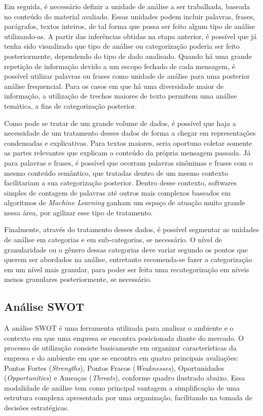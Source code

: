 Em seguida, é necessário definir a unidade de análise a ser trabalhada, baseada no conteúdo do material avaliado. Essas unidades podem incluir palavras, frases, parágrafos, textos inteiros, de tal forma que possa ser feito algum tipo de análise utilizando-as. A partir das inferências obtidas na etapa anterior, é possível que já tenha sido visualizado que tipo de análise ou categorização poderia ser feito posteriormente, dependendo do tipo de dado analisado. Quando há uma grande repetição de informação devido a um escopo fechado de cada mensagem, é possível utilizar palavras ou frases como unidade de análise para uma posterior análise frequencial. Para os casos em que há uma diversidade maior de informação, a utilização de trechos maiores de texto permitem uma análise temática, a fins de categorização posterior.

Como pode se tratar de um grande volume de dados, é possível que haja a necessidade de um tratamento desses dados de forma a chegar em representações condensadas e explicativas. Para textos maiores, seria oportuno coletar somente as partes relevantes que explicam o conteúdo da própria mensagem passada. Já para palavras e frases, é possível que ocorram palavras sinônimas e frases com o mesmo conteúdo semântico, que tratadas dentro de um mesmo contexto facilitariam a sua categorização posterior. Dentro desse contexto, softwares simples de contagem de palavras até outros mais complexos baseados em algoritmos de \textit{Machine Learning} ganham um espaço de atuação muito grande nessa área, por agilizar esse tipo de tratamento.

Finalmente, através do tratamento desses dados, é possível segmentar as unidades de análise em categorias e em sub-categorias, se necessário. O nível de granularidade ou o gênero dessas categorias deve variar segundo os pontos que querem ser abordados na análise, entretanto recomenda-se fazer a categorização em um nível mais granular, para poder ser feita uma recategorização em níveis menos granulares posteriormente, se necessário.

\subsection{Análise SWOT}
\label{cha:analise_swot}

A análise SWOT é uma ferramenta utilizada para analisar o ambiente e o contexto em que uma empresa se encontra posicionada diante do mercado. O processo de utilização consiste basicamente em organizar características da empresa e do ambiente em que se encontra em quatro principais avaliações: Pontos Fortes (\textit{Strengths}), Pontos Fracos (\textit{Weaknesses}), Oportunidades (\textit{Opportunities}) e Ameaças (\textit{Threats}), conforme quadro ilustrado abaixo. Essa modalidade de análise tem como principal vantagem a simplificação de uma estrutura complexa apresentada por uma organização, facilitando na tomada de decisões estratégicas.

